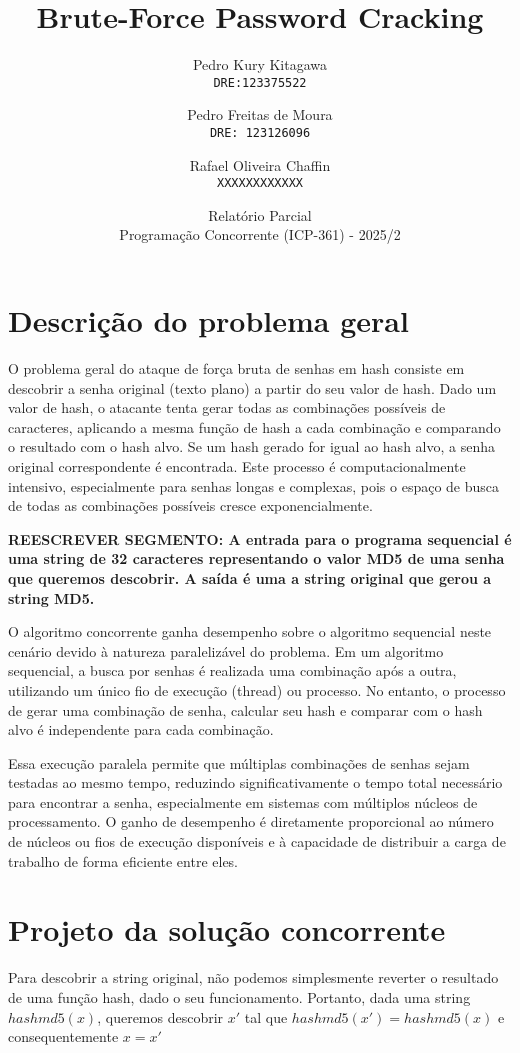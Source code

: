 \documentclass[12pt, a4paper]{article}
\title{Brute-Force Password Cracking}
\author{
  Pedro Kury Kitagawa\\
  \texttt{DRE:123375522}
  \and
  Pedro Freitas de Moura\\
  \texttt{DRE: 123126096}
  \and
  Rafael Oliveira Chaffin\\
  \texttt{XXXXXXXXXXXX}
}
\date{Relatório Parcial \\ Programação Concorrente (ICP-361) - 2025/2}
\begin{document}
\maketitle
\thispagestyle{empty}

\section{Descrição do problema geral}
O problema geral do ataque de força bruta de senhas em hash consiste em descobrir a senha original (texto plano) a partir do seu valor de hash. Dado um valor de hash, o atacante tenta gerar todas as combinações possíveis de caracteres, aplicando a mesma função de hash a cada combinação e comparando o resultado com o hash alvo. Se um hash gerado for igual ao hash alvo, a senha original correspondente é encontrada. Este processo é computacionalmente intensivo, especialmente para senhas longas e complexas, pois o espaço de busca de todas as combinações possíveis cresce exponencialmente.

\textbf{REESCREVER SEGMENTO: A entrada para o programa sequencial é uma string de 32 caracteres representando o valor MD5 de uma senha que queremos descobrir. A saída é uma a string original que gerou a string MD5.}

O algoritmo concorrente ganha desempenho sobre o algoritmo sequencial neste cenário devido à natureza paralelizável do problema. Em um algoritmo sequencial, a busca por senhas é realizada uma combinação após a outra, utilizando um único fio de execução (thread) ou processo. No entanto, o processo de gerar uma combinação de senha, calcular seu hash e comparar com o hash alvo é independente para cada combinação.

Essa execução paralela permite que múltiplas combinações de senhas sejam testadas ao mesmo tempo, reduzindo significativamente o tempo total necessário para encontrar a senha, especialmente em sistemas com múltiplos núcleos de processamento. O ganho de desempenho é diretamente proporcional ao número de núcleos ou fios de execução disponíveis e à capacidade de distribuir a carga de trabalho de forma eficiente entre eles.

\section{Projeto da solução concorrente}
Para descobrir a string original, não podemos simplesmente reverter o resultado de uma função hash, dado o seu funcionamento. Portanto, dada uma string $hashmd5(x)$, queremos descobrir $x'$ tal que $hashmd5(x')=hashmd5(x)$ e consequentemente $x = x'$ 
\end{document}
